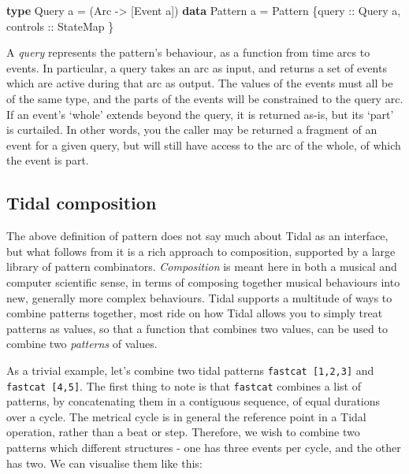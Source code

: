 \documentclass{nime-alternate} %
\newenvironment{Shaded}{\begin{snugshade}}{\end{snugshade}}
\newcommand{\DataTypeTok}[1]{\textcolor[rgb]{0.13,0.29,0.53}{#1}}
\newcommand{\KeywordTok}[1]{\textcolor[rgb]{0.13,0.29,0.53}{\textbf{#1}}}
\newcommand{\NormalTok}[1]{#1}
\newcommand{\OtherTok}[1]{\textcolor[rgb]{0.56,0.35,0.01}{#1}}
\begin{document}
\begin{Shaded}
\begin{Highlighting}[]
\KeywordTok{type} \DataTypeTok{Query}\NormalTok{ a }\OtherTok{=}\NormalTok{ (}\DataTypeTok{Arc} \OtherTok{{-}>}\NormalTok{ [}\DataTypeTok{Event}\NormalTok{ a])}
\KeywordTok{data} \DataTypeTok{Pattern}\NormalTok{ a }\OtherTok{=} \DataTypeTok{Pattern}\NormalTok{ \{}\OtherTok{query ::} \DataTypeTok{Query}\NormalTok{ a,}
\OtherTok{                          controls ::} \DataTypeTok{StateMap}
\NormalTok{\}}
\end{Highlighting}
\end{Shaded}

A \emph{query} represents the pattern's behaviour, as a function from
time arcs to events. In particular, a query takes an arc as input, and
returns a set of events which are active during that arc as output. The
values of the events must all be of the same type, and the parts of the
events will be constrained to the query arc. If an event's `whole'
extends beyond the query, it is returned as-is, but its `part' is
curtailed. In other words, you the caller may be returned a fragment of
an event for a given query, but will still have access to the arc of the
whole, of which the event is part.

\hypertarget{tidal-composition}{%
\subsection{Tidal composition}\label{tidal-composition}}

The above definition of pattern does not say much about Tidal as an
interface, but what follows from it is a rich approach to composition,
supported by a large library of pattern combinators. \emph{Composition}
is meant here in both a musical and computer scientific sense, in terms
of composing together musical behaviours into new, generally more
complex behaviours. Tidal supports a multitude of ways to combine
patterns together, most ride on how Tidal allows you to simply treat
patterns as values, so that a function that combines two values, can be
used to combine two \emph{patterns} of values.

As a trivial example, let's combine two tidal patterns
\texttt{fastcat\ {[}1,2,3{]}} and \texttt{fastcat\ {[}4,5{]}}. The first
thing to note is that \texttt{fastcat} combines a list of patterns, by
concatenating them in a contiguous sequence, of equal durations over a
cycle. The metrical cycle is in general the reference point in a Tidal
operation, rather than a beat or step. Therefore, we wish to combine two
patterns which different structures - one has three events per cycle,
and the other has two. We can visualise them like this:
\end{document}
